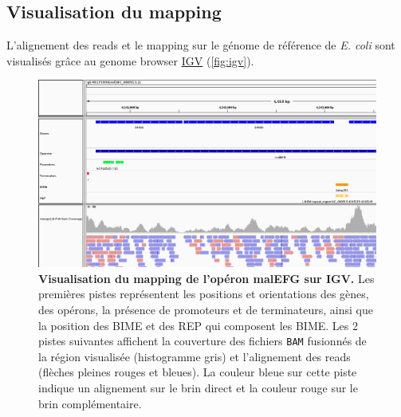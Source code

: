 \documentclass[12pt,a4paper]{report}
\begin{document}
\begin{onehalfspace}
\subsection*{Visualisation du mapping}
L'alignement des reads et le mapping sur le génome de référence de \textit{E. coli} sont visualisés grâce au genome browser \href{https://www.broadinstitute.org/igv/}{IGV} \citep{Robinson2011,Thorvaldsdottir2013} (\autoref{fig:igv}).

\begin{figure}[h!]
\centerline{\includegraphics[scale=0.4]{figures/igv_snapshot.png}}
\caption{\textbf{Visualisation du mapping de l'opéron malEFG sur IGV.} Les premières pistes représentent les positions et orientations des gènes, des opérons, la présence de promoteurs et de terminateurs, ainsi que la position des BIME et des REP qui composent les BIME. Les 2 pistes suivantes affichent la couverture des fichiers \texttt{BAM} fusionnés de la région visualisée (histogramme gris) et l'alignement des reads (flèches pleines rouges et bleues). La couleur bleue sur cette piste indique un alignement sur le brin direct et la couleur rouge sur le brin complémentaire.}
\label{fig:igv} 
\end{figure}


\end{onehalfspace}
\end{document}
